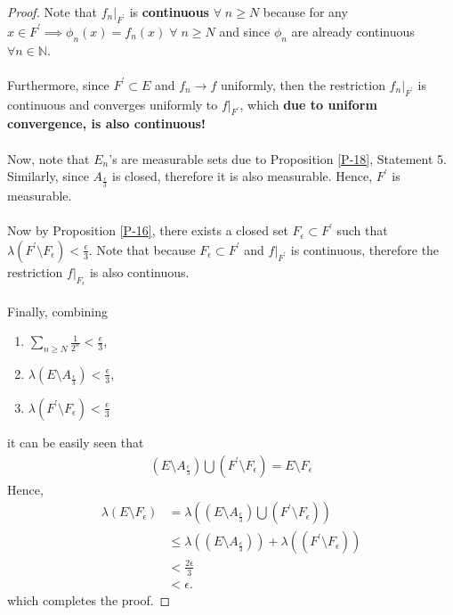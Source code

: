 \documentclass{article}
\theoremstyle{definition}
\theoremstyle{remark}
\theoremstyle{definition}
\theoremstyle{definition}
\theoremstyle{definition}
\newcommand{\bunion}{\bigcup}
\newcommand{\N}{\mathbb{N}}
\newcommand{\lm}[1]{\lambda\left (#1\right )}
\newcommand{\restrict}[2]{\left . #1 \right \vert_{#2}}
\begin{document}
\begin{proof}
Note that $ \restrict{f_n}{F^{\prime}} $ is \textbf{continuous} $ \forall\;n\ge N $ because for any $ x\in F^{\prime} \implies \phi_n(x) = f_n(x)\;\forall\;n\ge N$ and since $ \phi_n $ are already continuous $ \forall n\in  \N $. \\\\
Furthermore, since $ F^{\prime} \subset E$ and $ f_n\longrightarrow f $ uniformly, then the restriction $ \restrict{f_n}{F^{\prime}} $ is continuous and converges uniformly to $ \restrict{f}{F^{\prime}} $, which \textbf{due to uniform convergence, is also continuous!}\\\\
Now, note that $ E_n $'s are measurable sets due to Proposition \ref{P-18}, Statement 5. Similarly, since $ A_{\frac{\epsilon}{3}} $ is closed, therefore it is also measurable. Hence, $ F^{\prime} $ is measurable.\\\\
Now by Proposition \ref{P-16}, there exists a closed set $ F_{\epsilon} \subset F^{\prime}$ such that $ \lm{F^{\prime}\setminus F_{\epsilon}} < \frac{\epsilon}{3} $. Note that because $ F_{\epsilon}\subset  F^{\prime} $ and $ \restrict{f}{F^{\prime}} $ is continuous, therefore the restriction $ \restrict{f}{F_{\epsilon}} $ is also continuous.\\\\
Finally, combining 
\begin{enumerate}
	\item {$ \sum_{n\ge N} \frac{1}{2^{n}} < \frac{\epsilon}{3}$,}
	\item {$ \lm{E\setminus A_{\frac{\epsilon}{3}}} < \frac{\epsilon}{3} $,}
	\item {$ \lm{F^{\prime} \setminus F_{\epsilon}} < \frac{\epsilon}{3} $}
\end{enumerate}
it can be easily seen that
\begin{equation*}
	\begin{split}
		\left (E\setminus A_{\frac{\epsilon}{3}}\right ) \bunion \left (F^{\prime} \setminus F_{\epsilon}\right ) = E\setminus F_{\epsilon}
	\end{split}
\end{equation*}
Hence,
 \begin{equation*}
	\begin{split}
		 \lm{E\setminus F_{\epsilon}}&= \lm{\left (E\setminus A_{\frac{\epsilon}{3}}\right ) \bunion \left (F^{\prime} \setminus F_{\epsilon}\right )} \\&\le \lm{\left (E\setminus A_{\frac{\epsilon}{3}}\right )} + \lm{ \left (F^{\prime} \setminus F_{\epsilon}\right )} \\
		 &< \frac{2\epsilon}{3}\\
		 &< \epsilon.
	\end{split}
\end{equation*}
which completes the proof.
\end{proof}
\hrulefill
\newpage
\end{document}
